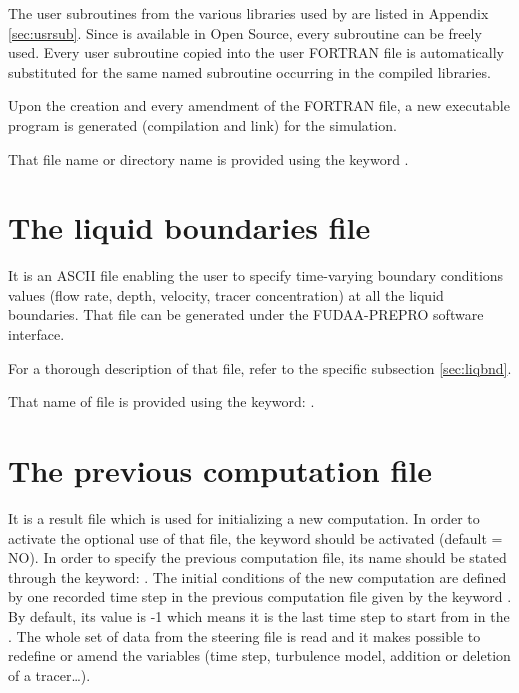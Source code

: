 The user subroutines from the various libraries used by  are listed
in Appendix \ref{sec:usrsub}. Since  is available in Open Source, every
subroutine can be freely used. Every user subroutine copied into the user
FORTRAN file is automatically substituted for the same named subroutine
occurring in the  compiled libraries.

Upon the creation and every amendment of the FORTRAN file, a new executable
program is generated (compilation and link) for the simulation.

That file name or directory name is provided using the keyword
.


\section{The liquid boundaries file}

It is an ASCII file enabling the user to specify time-varying boundary
conditions values (flow rate, depth, velocity, tracer concentration) at all the
liquid boundaries. That file can be generated under the FUDAA-PREPRO software
interface.

For a thorough description of that file, refer to the specific subsection
\ref{sec:liqbnd}.

That name of file is provided using the keyword: .


\section{The previous computation file}
\label{sec:previousfile}

It is a  result file which is used for initializing a new
computation. In order to activate the optional use of that file, the keyword
 should be activated (default = NO).
In order to specify the
previous computation file, its name should be stated through the keyword:
. The initial conditions of the new
computation are defined by one recorded time step in the previous
computation file given by the keyword .
By default, its value is -1 which means it is the last time step
to start from in the .
The whole set of data from the steering file is read and it
makes possible to redefine or amend the variables (time step, turbulence model,
addition or deletion of a tracer\dots).

